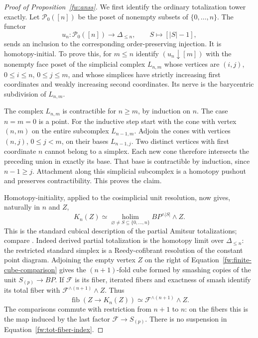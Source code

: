\begin{proof}[Proof of Proposition~\ref{fw:anss}]
We first identify the ordinary totalization tower exactly.  Let
$\mathcal P_0([n])$ be the poset of nonempty subsets of
$\{0,\ldots,n\}$.  The functor
\[
 u_n:\mathcal P_0([n])\longrightarrow\Delta_{\leq n},
 \qquad S\longmapsto[|S|-1],
\]
sends an inclusion to the corresponding order-preserving injection.
It is homotopy-initial.  To prove this, for $m\leq n$ identify
$(u_n\downarrow[m])$ with the nonempty face poset of the simplicial
complex $L_{n,m}$ whose vertices are $(i,j)$, $0\leq i\leq n$,
$0\leq j\leq m$, and whose simplices have strictly increasing first
coordinates and weakly increasing second coordinates.  Its nerve is
the barycentric subdivision of $L_{n,m}$.

The complex $L_{n,m}$ is contractible for $n\geq m$, by induction on
$n$.  The case $n=m=0$ is a point.  For the inductive step start with
the cone with vertex $(n,m)$ on the entire subcomplex $L_{n-1,m}$.
Adjoin the cones with vertices $(n,j)$, $0\leq j<m$, on their bases
$L_{n-1,j}$.  Two distinct vertices with first coordinate $n$ cannot
belong to a simplex.  Each new cone therefore intersects the preceding
union in exactly its base.  That base is contractible by induction,
since $n-1\geq j$.  Attachment along this simplicial subcomplex is a
homotopy pushout and preserves contractibility.  This proves the claim.

Homotopy-initiality, applied to the cosimplicial unit resolution, now
gives, naturally in $n$ and $Z$,
\begin{equation}
 K_n(Z)\simeq
 \operatorname*{holim}_{\varnothing\ne S\subseteq\{0,\ldots,n\}}
       BP^{\wedge|S|}\wedge Z.
 \label{fw:finite-cube-comparison}
\end{equation}
This is the standard cubical description of the partial Amitsur
totalizations; compare \citet[Propositions~2.11 and~2.14]{MathewNaumannNoel2017}.
Indeed derived partial totalization is the homotopy limit over
$\Delta_{\leq n}$: the restricted standard simplex is a Reedy-cofibrant
resolution of the constant point diagram.  Adjoining the empty vertex
$Z$ on the right of Equation~\eqref{fw:finite-cube-comparison} gives
the $(n+1)$-fold cube formed by smashing copies of the unit
$S_{(p)}\to BP$.  If $\mathcal F$ is its fiber, iterated fibers and
exactness of smash identify its total fiber with
$\mathcal F^{\wedge(n+1)}\wedge Z$.  Thus
\begin{equation}
 \operatorname{fib}(Z\longrightarrow K_n(Z))
       \simeq\mathcal F^{\wedge(n+1)}\wedge Z.
 \label{fw:tot-fiber-index}
\end{equation}
The comparisons commute with restriction from $n+1$ to $n$: on the
fibers this is the map induced by the last factor
$\mathcal F\to S_{(p)}$.  There is no suspension in
Equation~\eqref{fw:tot-fiber-index}.


\end{proof}
